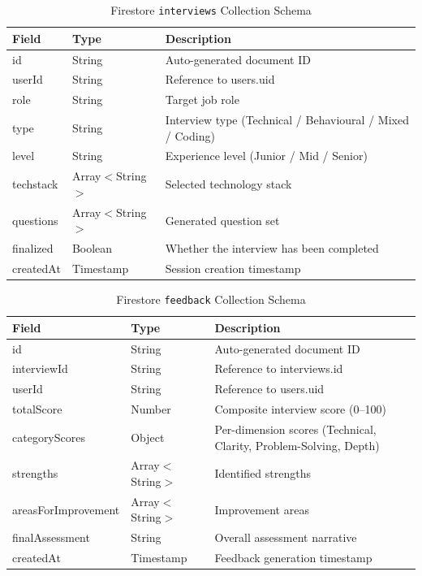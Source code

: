 \documentclass[12pt,a4paper,oneside]{report}
\begin{document}
\begin{table}[H]
\centering
\caption{Firestore \texttt{interviews} Collection Schema}
\label{tab:schema_interviews}
\begin{tabular}{|p{3.5cm}|p{2.5cm}|p{7cm}|}
\hline
\textbf{Field} & \textbf{Type} & \textbf{Description} \\
\hline
id & String & Auto-generated document ID \\
\hline
userId & String & Reference to users.uid \\
\hline
role & String & Target job role \\
\hline
type & String & Interview type (Technical / Behavioural / Mixed / Coding) \\
\hline
level & String & Experience level (Junior / Mid / Senior) \\
\hline
techstack & Array$<$String$>$ & Selected technology stack \\
\hline
questions & Array$<$String$>$ & Generated question set \\
\hline
finalized & Boolean & Whether the interview has been completed \\
\hline
createdAt & Timestamp & Session creation timestamp \\
\hline
\end{tabular}
\end{table}

\begin{table}[H]
\centering
\caption{Firestore \texttt{feedback} Collection Schema}
\label{tab:schema_feedback}
\begin{tabular}{|p{3.5cm}|p{2.5cm}|p{7cm}|}
\hline
\textbf{Field} & \textbf{Type} & \textbf{Description} \\
\hline
id & String & Auto-generated document ID \\
\hline
interviewId & String & Reference to interviews.id \\
\hline
userId & String & Reference to users.uid \\
\hline
totalScore & Number & Composite interview score (0--100) \\
\hline
categoryScores & Object & Per-dimension scores (Technical, Clarity, Problem-Solving, Depth) \\
\hline
strengths & Array$<$String$>$ & Identified strengths \\
\hline
areasForImprovement & Array$<$String$>$ & Improvement areas \\
\hline
finalAssessment & String & Overall assessment narrative \\
\hline
createdAt & Timestamp & Feedback generation timestamp \\
\hline
\end{tabular}
\end{table}
\end{document}
